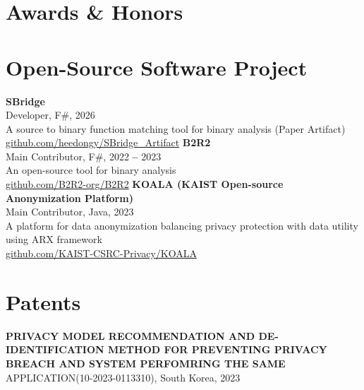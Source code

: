 \documentclass[letterpaper,11pt]{article}
\begin{document}

\section{Awards \& Honors}
  \vspace{3pt}
  \paperListStart
  \paperListEnd


\section{Open-Source Software Project}
\vspace{3pt}
\paperListStart
  \resumeItem
  {\textbf{SBridge} \\
    Developer, F\#, 2026 \\
    A source to binary function matching tool for binary analysis (Paper Artifact) \\
    \faGithub \hspace{.5pt} \href{https://github.com/heedongy/SBridge_Artifact}{github.com/heedongy/SBridge\_Artifact}}
  \resumeItem
    {\textbf{B2R2} \\
    Main Contributor, F\#, 2022 \textbf{--} 2023 \\
    An open-source tool for binary analysis \\
    \faGithub \hspace{.5pt} \href{https://github.com/B2R2-org/B2R2}{github.com/B2R2-org/B2R2}}
  \resumeItem
    {\textbf{KOALA (KAIST Open-source Anonymization Platform)} \\
    Main Contributor, Java, 2023\\
    A platform for data anonymization balancing privacy protection with data utility using ARX framework \\
    \faGithub \hspace{.5pt} \href{https://github.com/KAIST-CSRC-Privacy/KOALA}{github.com/KAIST-CSRC-Privacy/KOALA}}
\paperListEnd


\section{Patents}
  \vspace{3pt}
  \paperListStart
    \resumeItem
      {\textbf{PRIVACY MODEL RECOMMENDATION AND DE-IDENTIFICATION METHOD FOR PREVENTING PRIVACY BREACH AND SYSTEM PERFOMRING THE SAME}\\APPLICATION(10-2023-0113310), South Korea, 2023}
  \paperListEnd
\end{document}
